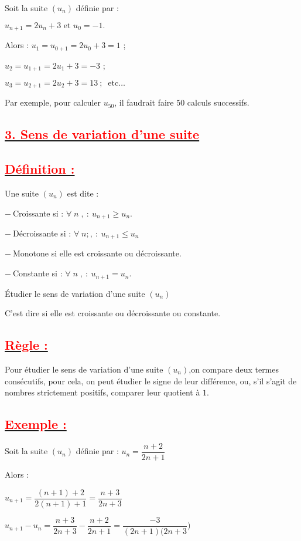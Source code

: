 \documentclass[12pt]{article}
\begin{document}
Soit la suite $\left(u_{n}\right)$ définie par :
	
$u_{n+1}=2u_{n}+3\text{ et }u_{0}=-1.$
	
Alors : $u_{1}=u_{0+1}=2u_{0}+3=1$ ;
	
$u_{2}=u_{1+1}=2u_{1}+3=-3$ ;
	
$u_{3}=u_{2+1}=2u_{2}+3=13\ ;\ \text{ etc}\ldots$
	
Par exemple, pour calculer $u_{50}$, il faudrait faire $50$ calculs successifs.
\subsection*{\underline{\textbf{\textcolor{red}{3. Sens de variation d'une suite}}}}
\subsection*{\underline{\textbf{\textcolor{red}{Définition :}}}}
	
Une suite $\left(u_{n}\right)$ est dite :
	
$-\ $Croissante si : $\forall\;n\;,\ :\ u_{n+1}\geq u_{n}.$
	
$-\ $Décroissante si : $\forall\;n;,\ :\ u_{n+1}\leq u_{n}$

$-\ $Monotone si elle est croissante ou décroissante.

$-\ $Constante si : $\forall\;n\;,\ :\ u_{n+1}=u_{n}.$

Étudier le sens de variation d'une suite $\left(u_{n}\right)$

C'est dire si elle est croissante ou décroissante ou constante.
\subsection*{\underline{\textbf{\textcolor{red}{Règle :}}}}
Pour étudier le sens de variation d'une suite $\left(u_{n}\right)$,on compare deux termes consécutifs, pour cela, on peut étudier le signe de leur différence, ou, s'il s'agit de nombres strictement positifs, comparer leur quotient à $1.$
\subsection*{\underline{\textbf{\textcolor{red}{Exemple :}}}}
Soit la suite $\left(u_{n}\right)$ définie par : $u_{n}=\dfrac{n+2}{2n+1}$

Alors :

$u_{n+1}=\dfrac{(n+1)+2}{2(n+1)+1}=\dfrac{n+3}{2n+3}$
	
$u_{n+1}-u_{n}=\dfrac{n+3}{2n+3}-\dfrac{n+2}{2n+1}=\dfrac{-3}{(2n+1)(2n+3})$
	
\end{document}
